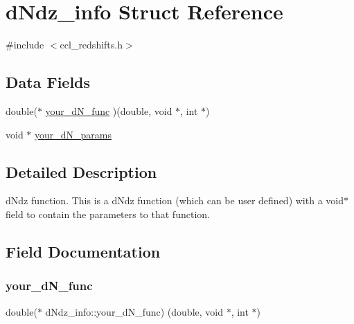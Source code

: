 \hypertarget{structd_ndz__info}{}\section{d\+Ndz\+\_\+info Struct Reference}
\label{structd_ndz__info}


{\ttfamily \#include $<$ccl\+\_\+redshifts.\+h$>$}

\subsection*{Data Fields}
\begin{DoxyCompactItemize}
\item 
double($\ast$ \mbox{\hyperlink{structd_ndz__info_a2e30312218187d41c9794ebeb51a929e}{your\+\_\+d\+N\+\_\+func}} )(double, void $\ast$, int $\ast$)
\item 
void $\ast$ \mbox{\hyperlink{structd_ndz__info_aee9a21a14c1bfcd3243eb9d1ab462ac8}{your\+\_\+d\+N\+\_\+params}}
\end{DoxyCompactItemize}


\subsection{Detailed Description}
d\+Ndz function. This is a d\+Ndz function (which can be user defined) with a void$\ast$ field to contain the parameters to that function. 

\subsection{Field Documentation}
\mbox{\label{structd_ndz__info_a2e30312218187d41c9794ebeb51a929e}} 
\subsubsection{\texorpdfstring{your\+\_\+d\+N\+\_\+func}{your\_dN\_func}}
{\footnotesize\ttfamily double($\ast$  d\+Ndz\+\_\+info\+::your\+\_\+d\+N\+\_\+func) (double, void $\ast$, int $\ast$)}

\mbox{\label{structd_ndz__info_aee9a21a14c1bfcd3243eb9d1ab462ac8}} 
